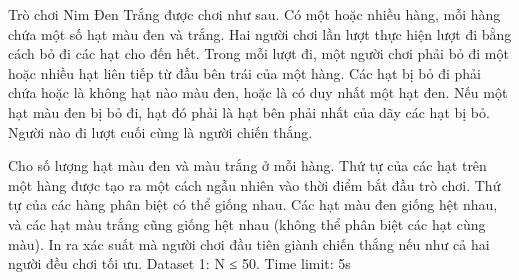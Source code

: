 Trò chơi Nim Đen Trắng được chơi như sau. Có một hoặc nhiều hàng, mỗi hàng chứa một số hạt màu đen và trắng. Hai người chơi lần lượt thực hiện lượt đi bằng cách bỏ đi các hạt cho đến hết. Trong mỗi lượt đi, một người chơi phải bỏ đi một hoặc nhiều hạt liên tiếp từ đầu bên trái của một hàng. Các hạt bị bỏ đi phải chứa hoặc là không hạt nào màu đen, hoặc là có duy nhất một hạt đen. Nếu một hạt màu đen bị bỏ đi, hạt đó phải là hạt bên phải nhất của dãy các hạt bị bỏ. Người nào đi lượt cuối cùng là người chiến thắng.  

   Cho số lượng hạt màu đen và màu trắng ở mỗi hàng. Thứ tự của các hạt trên một hàng được tạo ra một cách ngẫu nhiên vào thời điểm bắt đầu trò chơi. Thứ tự của các hàng phân biệt có thể giống nhau. Các hạt màu đen giống hệt nhau, và các hạt màu trắng cũng giống hệt nhau (không thể phân biệt các hạt cùng màu). In ra xác suất mà người chơi đầu tiên giành chiến thắng nếu như cả hai người đều chơi tối ưu.
Dataset 1: N ≤ 50. Time limit: 5s